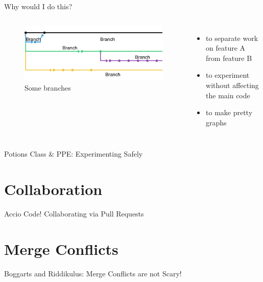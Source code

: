 \documentclass{beamer}
\theoremstyle{example}
\begin{document}
\begin{frame}{Why would I do this?}
    \begin{columns}
        \begin{figure}
            \includegraphics[scale=0.4]{img/branches}
            \caption{Some branches}
        \end{figure}

        \begin{itemize}
            \item to separate work on feature A from feature B
            \item to experiment without affecting the main code
            \item to make pretty graphs
        \end{itemize}
    \end{columns}
\end{frame}

\begin{frame}{Potions Class \& PPE\@: Experimenting Safely}
\end{frame}

\section{Collaboration}
\begin{frame}{Accio Code! Collaborating via Pull Requests}
\end{frame}

\section{Merge Conflicts}
\begin{frame}{Boggarts and Riddikulus: Merge Conflicts are \alert{not} Scary!}
\end{frame}
\end{document}

